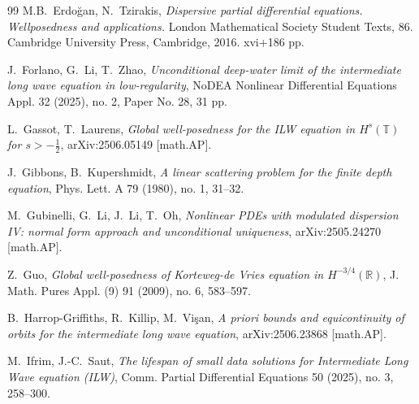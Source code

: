 \documentclass[letterpaper, 11pt,  reqno]{amsart}
\newcommand{\1}{\hspace{0.5mm}\textup{I}\hspace{0.5mm}}
\newcommand{\R}{\mathbb{R}}
\newcommand{\T}{\mathbb{T}}
\numberwithin{equation}{section}
\numberwithin{theorem}{section}
\begin{document}
\begin{thebibliography}{99}
M.B.~Erdo\u{g}an, N.~Tzirakis, 
{\it Dispersive partial differential equations. Wellposedness and applications.} London Mathematical Society Student Texts, 86. Cambridge University Press, Cambridge, 2016. xvi+186 pp.
	
	
J.~Forlano, G.~Li, T.~Zhao,
\textit{Unconditional deep-water limit of the intermediate long wave equation in low-regularity},
 NoDEA Nonlinear Differential Equations Appl. 32 (2025), no. 2, Paper No. 28, 31 pp. 


L.~Gassot, T.~Laurens, 
{\it Global well-posedness for the ILW equation in $H^s(\mathbb{T})$ for $s>-\frac12$}, 
arXiv:2506.05149 [math.AP].





J.~Gibbons, B.~Kupershmidt, 
{\it A linear scattering problem for the finite depth equation},
Phys. Lett. A 79 (1980), no. 1, 31--32. 	
	


M.~Gubinelli, G.~Li, J.~Li, T.~Oh,
{\it Nonlinear PDEs with modulated dispersion IV: normal form approach and unconditional uniqueness},
arXiv:2505.24270 [math.AP].


Z.~Guo, 
{\it Global well-posedness of Korteweg-de Vries equation in $H^{-3/4}(\R)$},  J. Math. Pures Appl. (9) 91 (2009), no. 6, 583--597. 




B.~Harrop-Griffiths, R.~Killip, M.~Vi\c{s}an,
\textit{A priori bounds and equicontinuity of orbits for the intermediate long wave equation}, 
arXiv:2506.23868 [math.AP]. 


M.~Ifrim, J.-C.~Saut,
{\it The lifespan of small data solutions for Intermediate Long Wave equation (ILW)}, 
 Comm. Partial Differential Equations 50 (2025), no. 3, 258--300.

	





\end{thebibliography}
\end{document}
